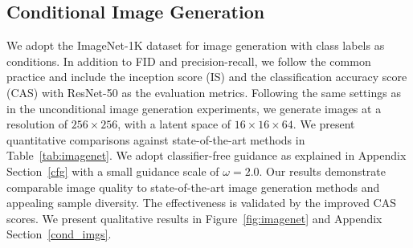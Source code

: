 \documentclass[10pt,twocolumn,letterpaper]{article}
\begin{document}
\begin{table}[]
    \centering
    \small
    \caption{FID comparisons on $1024\times1024$ high-resolution image generation with FFHQ and CelebA-HQ. $\dagger$ indicates the results we obtain based on their official implementations. }
    \label{tab:highres}
\vspace{-2mm}
\end{table}




\subsection{Conditional Image Generation}

We adopt the ImageNet-1K dataset for image generation with class labels as conditions. 
In addition to FID and precision-recall, we follow the common practice and include the inception score (IS) \cite{salimans2016improved}  and the classification accuracy score (CAS) \cite{cas} with ResNet-50 \cite{resnet} as the evaluation metrics. 
Following the same settings as in the unconditional image generation experiments, we generate images at a resolution of $256\times256$, with a latent space of $16\times16\times64$. 
We present quantitative comparisons against state-of-the-art methods in Table~\ref{tab:imagenet}.
We adopt classifier-free guidance \cite{ho2022classifier} as explained in Appendix Section~\ref{cfg} with a small guidance scale of $\omega = 2.0$.
Our results demonstrate comparable image quality to state-of-the-art image generation methods and appealing sample diversity. The effectiveness is validated by the improved CAS scores. 
We present qualitative results in Figure~\ref{fig:imagenet} and Appendix Section~\ref{cond_imgs}.
\end{document}
